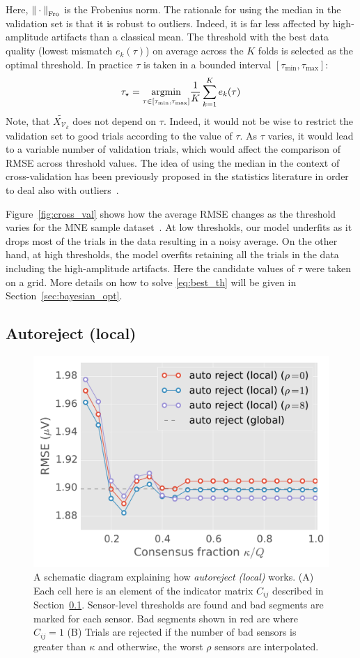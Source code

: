 Here, ${\| \cdot \|}_{\mathrm{Fro}}$ is the Frobenius norm. The rationale for using the median in the validation set is that it is robust to outliers. Indeed, it is far less affected by high-amplitude artifacts than a classical mean. The threshold with the best data quality (lowest mismatch $e_{k}(\tau)$) on average across the $K$ folds is selected as the optimal threshold. In practice $\tau$ is taken in a bounded interval $[\tau_{\min}, \tau_{\max}]$:
%
\begin{equation}
\tau_{\star} = \underset{\tau \in [\tau_{\min}, \tau_{\max}]} {\mathop{\mathrm{argmin}}} \frac{1}{K} \sum_{k=1}^{K}  e_{k}(\tau)
\label{eq:best_th}
\end{equation}
Note, that $\widetilde{X_{\mathcal{V}_k}}$ does not depend on $\tau$. Indeed, it would not be wise to restrict the validation set to good trials according to the value of $\tau$. As $\tau$ varies, it would lead to a variable number of validation trials, which would affect the comparison of RMSE across threshold values. The idea of using the median in the context of cross-validation has been previously proposed in the statistics literature in order to deal also with outliers~\citep{leung2005cross,de2003robust}.

Figure~\ref{fig:cross_val} shows how the average RMSE changes as the threshold varies for the MNE sample dataset~\citep{gramfort2013meg,mne}. At low thresholds, our model underfits as it drops most of the trials in the data resulting in a noisy average. On the other hand, at high thresholds, the model overfits retaining all the trials in the data including the high-amplitude artifacts. Here the candidate values of $\tau$ were taken on a grid. More details on how to solve \eqref{eq:best_th} will be given in Section~\ref{sec:bayesian_opt}.

\subsection{Autoreject (local)}
\label{sec:auto_local}

\begin{figure}[t]
	\centering
	\includegraphics[width=0.5\linewidth]{figures/figure3.pdf}
    \caption{A schematic diagram explaining how \emph{autoreject (local)} works. (A) Each cell here is an element of the indicator matrix $C_{ij}$ described in Section~\ref{sec:auto_local}. Sensor-level thresholds are found and bad segments are marked for each sensor. Bad segments shown in red are where $C_{ij}=1$ (B) Trials are rejected if the number of bad sensors is greater than $\kappa$ and otherwise, the worst $\rho$ sensors are interpolated.}
    \label{fig:schematic}
\end{figure}

